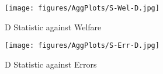 \documentclass[../main.tex]{subfiles}
\begin{document}
\begin{figure}[hp!]
	\center
	\caption{D Statistic against Welfare}
	\texttt{[image: figures/AggPlots/S-Wel-D.jpg]}
	\label{fig:D-Wel-smooth}
\end{figure}

\begin{figure}[hp!]
	\center
	\caption{D Statistic against Errors}
	\texttt{[image: figures/AggPlots/S-Err-D.jpg]}
	\label{fig:D-Err-smooth}
\end{figure}

\newpage

\printbibliography[segment=3, heading=subbibliography]
\end{document}
